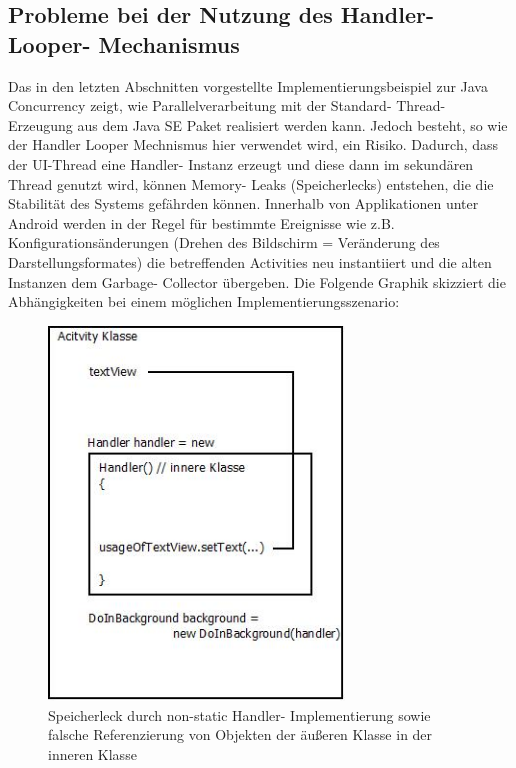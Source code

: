 \documentclass[12pt,oneside,a4paper,bibtotoc,liststotoc]{scrreprt}
\begin{document}
\subsection{Probleme bei der Nutzung des Handler- Looper- Mechanismus}
Das in den letzten Abschnitten vorgestellte Implementierungsbeispiel zur Java Concurrency zeigt, wie Parallelverarbeitung mit der Standard- Thread- Erzeugung aus dem Java SE Paket realisiert werden kann. Jedoch besteht, so wie der Handler Looper Mechnismus hier verwendet wird, ein Risiko. Dadurch, dass der UI-Thread eine Handler- Instanz erzeugt und diese dann im sekundären Thread genutzt wird, können Memory- Leaks (Speicherlecks) entstehen, die die Stabilität des Systems gefährden können. Innerhalb von Applikationen unter Android werden in der Regel für bestimmte Ereignisse wie z.B. Konfigurationsänderungen (Drehen des Bildschirm = Veränderung des Darstellungsformates) die betreffenden Activities neu instantiiert und die alten Instanzen dem Garbage- Collector übergeben. Die Folgende Graphik skizziert die Abhängigkeiten bei einem möglichen Implementierungsszenario:
\begin{figure}[H]
  \begin{centering}
    \includegraphics[width=0.7\textwidth]{img/weakReference.jpeg}
    \caption{Speicherleck durch non-static Handler- Implementierung sowie falsche Referenzierung von Objekten der äußeren Klasse in der inneren Klasse}
    \label{weakReference}
  \end{centering}
\end{figure}
\end{document}
